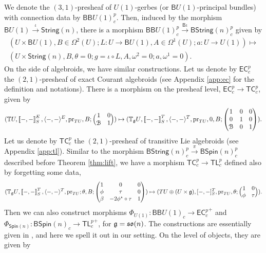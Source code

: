 \documentclass[letterpaper,10pt, oneside]{article} %
\newcommand{\ecalgdp}{\mathsf{EC}^{p}_{c}} %
\newcommand{\tlp}{{\mathsf{TL}^{p}_{c}}} %
\newcommand{\tlpp}{{{\mathsf{TL}^{p}_{c}}}^+} %
\newcommand{\tcalgdp}{{\mathsf{TC}^{p}_{c}}} %
\newcommand{\ecalgdpp}{{\mathsf{EC}^{p}_{c}}^+} %
\newcommand{\bstringnp}{\mathsf{BString}(n)^p_{c}} %
\newcommand{\String}{\mathsf{String}}%
\newcommand{\Spin}{\mathsf{Spin}}%
\newcommand{\B}{\mathsf{B}}%
\newcommand{\tagu}{{\mathbb{T}_\g U}}
\newcommand{\T}{{\mathbb{T}}}
\newcommand{\huaB}{\mathcal{B}}%
\newcommand{\Courant}[1]{\left\llbracket  #1\right\rrbracket }
\newcommand{\pr}{\mathrm{pr}}
\begin{document}
We denote the $(3,1)$-presheaf of $U(1)$-gerbes (or $\B U(1)$-principal bundles) with connection data by $\B \B U(1)^p_c$. Then, induced by the morphism  $\B U(1) \xrightarrow{\iota} \String(n)$, there is a morphism $\B \B U(1)^p_c \xrightarrow{\B\iota } \bstringnp$ given by
\[
\begin{split}
(U\times \B U(1), B\in \Omega^2(U); L: U\to \B U(1), A\in \Omega^1(U); a: U\to U(1)) \mapsto \\
(U\times \String(n), B, \theta=0; g=\iota \circ L, A, \omega^2=0; a, \omega^1=0).
\end{split}
\]
On the side of algebroids, we have similar constructions. Let us denote by $\ecalgdp$ the $(2,1)$-presheaf of exact Courant algebroids (see Appendix \ref{app:ec} for the definition and notations). There is a morphism on the presheaf level, $\ecalgdp \to \tcalgdp$,  given by
\[
(\T U, \Courant{-,- }^E_S, \langle-, - \rangle^E, \pr_{TU}, B; \Big( \begin{matrix} 1 & 0 \\ \huaB & 1 \end{matrix} \Big) ) \mapsto (\tagu, \Courant{-,-}^T_S, \langle-, - \rangle^T,  \pr_{TU},0, B; \left( \begin{matrix} 1 & 0 & 0 \\ 0  & 1 &0 \\ \huaB & 0 & 1 \end{matrix} \right)).
\]
Let us denote by $\tcalgdp$ the $(2,1)$-presheaf of transitive Lie algebroids (see Appendix \ref{app:tl}). Similar to the morphism $\bstringnp \xrightarrow{\pi}\mathsf{B}\Spin(n)_{c}^p$ described before Theorem \ref{thm:lift}, we have a morphism $\tcalgdp \to \tlp$ defined also by forgetting some data,
\[
(\tagu, \Courant{-, -}^T_S, \langle-, -\rangle^T, \pr_{TU}; \theta, B;  \left( \begin{matrix} 1 & 0 & 0 \\ \phi & \tau &0 \\ \beta & -2\phi^\star\circ \tau & 1 \end{matrix} \right) ) \mapsto (TU\oplus (U\times{\g}), [-,-]^T_S,  \pr_{TU},\theta; \Big( \begin{matrix} 1 & 0 \\ \phi & \tau  \end{matrix} \Big) ).
\]
Then we can also construct morphisms $\Phi_{U(1)}: \B \B U(1)_c \to \ecalgdpp$ and $\Phi_{\Spin(n)}: \B \Spin(n)_c \to \tlpp$, for $\mathfrak g=\mathfrak{so}(n)$. The constructions are essentially given in \cite{sevlet,MK2}, and here we  spell it out in our setting. On the level of objects, they are given by
\end{document}
